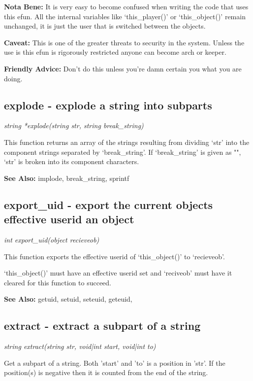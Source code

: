     {\bf Nota Bene: }   It is very easy to become confused when writing the code that uses
    this efun. All the internal variables like `this\_player()' or
    `this\_object()' remain unchanged, it is just the user that is 
    switched between the objects.

    {\bf Caveat: }  This is one of the greater threats to security in the system. Unless
    the use is this efun is rigorously restricted anyone can become arch
    or keeper.

{\bf Friendly Advice:}
    Don't do this unless you're damn certain you what you are doing.



\subsection{explode - explode a string into subparts}

    {\em string *explode(string str, string break\_string)}

    This function returns an array of the strings resulting from
    dividing `str' into the component strings separated by 
    `break\_string'. If `break\_string' is given as "", `str' is
    broken into its component characters.

    {\bf See Also: }    implode, break\_string, sprintf


\subsection{export\_uid - export the current objects effective userid an object}

    {\em int export\_uid(object recieveob)}

    This function exports the effective userid of `this\_object()' to 
    `recieveob'.
    
    `this\_object()' must have an effective userid set and `reciveob' 
    must have it cleared for this function to succeed.
    
    {\bf See Also: }    getuid, setuid, seteuid, geteuid, 



\subsection{extract - extract a subpart of a string}

    {\em string extract(string str, void|int start, void|int to)}

    Get a subpart of a string. Both 'start' and 'to' is a position in
    'str'. If the position(s) is negative then it is counted from the
    end of the string.

